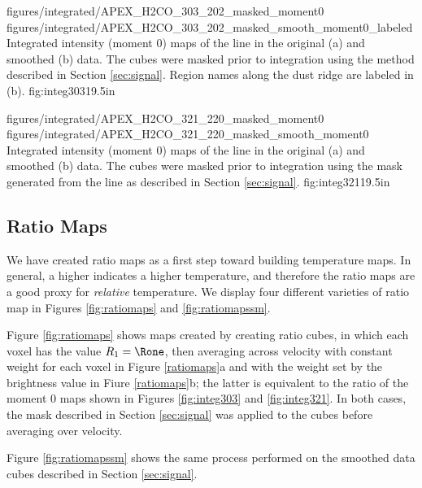 \RotFigureTwoAA
{figures/integrated/APEX_H2CO_303_202_masked_moment0}
{figures/integrated/APEX_H2CO_303_202_masked_smooth_moment0_labeled}
{Integrated intensity (moment 0) maps of the \para \threeohthree line in the
original (a) and smoothed (b) data.  The cubes were masked prior to integration
using the method described in Section \ref{sec:signal}.  Region names along the
dust ridge are labeled in (b).}
{fig:integ303}{1}{9.5in}

\RotFigureTwoAA
{figures/integrated/APEX_H2CO_321_220_masked_moment0}
{figures/integrated/APEX_H2CO_321_220_masked_smooth_moment0}
{Integrated intensity (moment 0) maps of the \para \threetwoone line in the
original (a) and smoothed (b) data.  The cubes were masked prior to integration
using the mask generated from the \threeohthree line as described in Section
\ref{sec:signal}.}
{fig:integ321}{1}{9.5in}

\subsection{Ratio Maps}
\label{sec:ratio}
We have created \Rone ratio maps as a first step toward building temperature
maps.  In general, a higher \Rone indicates a higher temperature, and therefore
the ratio maps are a good proxy for \emph{relative} temperature.  We display
four different varieties of ratio map in Figures \ref{fig:ratiomaps} and
\ref{fig:ratiomapssm}.

Figure \ref{fig:ratiomaps} shows maps created by creating ratio cubes, in which
each voxel has the value $R_1=\Rone$, then averaging across velocity with
constant weight for each voxel in Figure \ref{ratiomaps}a and with the weight
set by the \threeohthree brightness value in Fiure \ref{ratiomaps}b; the latter is
equivalent to the ratio of the moment 0 maps shown in Figures
\ref{fig:integ303} and \ref{fig:integ321}.  In both
cases, the mask described in Section \ref{sec:signal} was applied to the cubes
before averaging over velocity.

Figure \ref{fig:ratiomapssm} shows the same process performed on the smoothed
data cubes described in Section \ref{sec:signal}.



